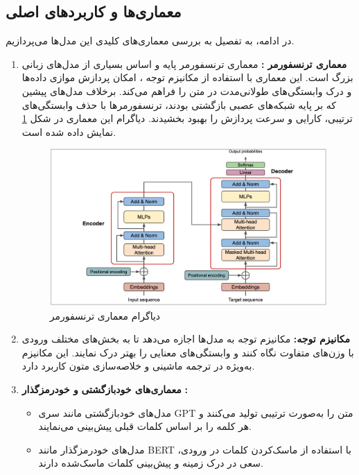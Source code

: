 \subsection{معماری‌ها و کاربردهای اصلی}
در ادامه، به تفصیل به بررسی معماری‌های کلیدی این مدل‌ها می‌پردازیم.
\begin{enumerate}
	\item \textbf{معماری ترنسفورمر}
	\textbf{:}
	معماری ترنسفورمر پایه و اساس بسیاری از مدل‌های زبانی بزرگ است. این معماری با استفاده از مکانیزم توجه
	، امکان پردازش موازی داده‌ها و درک وابستگی‌های طولانی‌مدت در متن را فراهم می‌کند. برخلاف مدل‌های پیشین که بر پایه شبکه‌های عصبی بازگشتی
	 بودند، ترنسفورمرها با حذف وابستگی‌های ترتیبی، کارایی و سرعت پردازش را بهبود بخشیدند. دیاگرام این معماری در شکل \ref{fig_transformer} نمایش داده شده است.
	 \begin{figure}[!t]
	 	\centering
	 	\includegraphics[width=140mm]{images/transformer}
	 	\caption{دیاگرام معماری ترنسفورمر }
	 	\label{fig_transformer}
	 \end{figure}
	 
	\item \textbf{مکانیزم توجه:}
	مکانیزم توجه به مدل‌ها اجازه می‌دهد تا به بخش‌های مختلف ورودی با وزن‌های متفاوت نگاه کنند و وابستگی‌های معنایی را بهتر درک نمایند. این مکانیزم به‌ویژه در ترجمه ماشینی و خلاصه‌سازی متون کاربرد دارد.
	
	\item \textbf{معماری‌های خودبازگشتی}
	\textbf{ و خودرمزگذار}
	 \textbf{:}
	\begin{itemize}
		\item 
	مدل‌های خودبازگشتی مانند سری GPT متن را به‌صورت ترتیبی تولید می‌کنند و هر کلمه را بر اساس کلمات قبلی پیش‌بینی می‌نمایند.
		\item 
	مدل‌های خودرمزگذار مانند BERT با استفاده از ماسک‌کردن کلمات در ورودی، سعی در درک زمینه و پیش‌بینی کلمات ماسک‌شده دارند.
	\end{itemize}
\end{enumerate}

